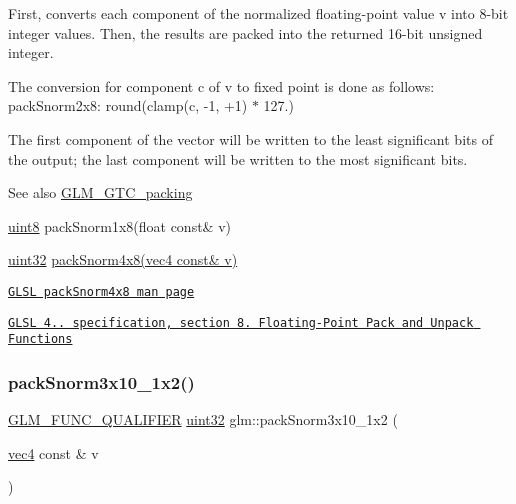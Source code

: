 First, converts each component of the normalized floating-\/point value v into 8-\/bit integer values. Then, the results are packed into the returned 16-\/bit unsigned integer.

The conversion for component c of v to fixed point is done as follows\+: pack\+Snorm2x8\+: round(clamp(c, -\/1, +1) $\ast$ 127.)

The first component of the vector will be written to the least significant bits of the output; the last component will be written to the most significant bits.

\begin{DoxySeeAlso}{See also}
\hyperlink{group__gtc__packing}{G\+L\+M\+\_\+\+G\+T\+C\+\_\+packing} 

\hyperlink{group__gtc__type__precision_ga1a7dcd8aac97cc8020817c94049deff2}{uint8} pack\+Snorm1x8(float const\& v) 

\hyperlink{group__gtc__type__precision_ga202b6a53c105fcb7e531f9b443518451}{uint32} \hyperlink{group__core__func__packing_ga85e8f17627516445026ab7a9c2e3531a}{pack\+Snorm4x8(vec4 const\& v)} 

\href{http://www.opengl.org/sdk/docs/manglsl/xhtml/packSnorm4x8.xml}{\tt G\+L\+SL pack\+Snorm4x8 man page} 

\href{http://www.opengl.org/registry/doc/GLSLangSpec.4.20.8.pdf}{\tt G\+L\+SL 4.. specification, section 8. Floating-\/\+Point Pack and Unpack Functions} 
\end{DoxySeeAlso}
\mbox{\label{group__gtc__packing_ga0d4157cec37c0312216a7be1cc92df54}} 
\subsubsection{\texorpdfstring{pack\+Snorm3x10\+\_\+1x2()}{packSnorm3x10\_1x2()}}
{\footnotesize\ttfamily \hyperlink{setup_8hpp_a33fdea6f91c5f834105f7415e2a64407}{G\+L\+M\+\_\+\+F\+U\+N\+C\+\_\+\+Q\+U\+A\+L\+I\+F\+I\+ER} \hyperlink{group__gtc__type__precision_ga202b6a53c105fcb7e531f9b443518451}{uint32} glm\+::pack\+Snorm3x10\+\_\+1x2 (\begin{DoxyParamCaption}\item[{\hyperlink{group__core__types_ga5881b1b022d7fd1b7218f5916532dd02}{vec4} const \&}]{v }\end{DoxyParamCaption})}


